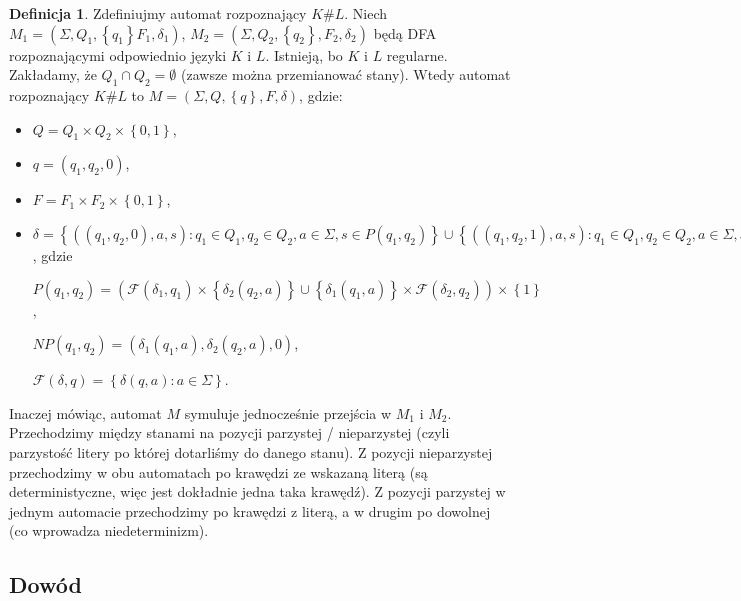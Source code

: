 \documentclass{article}
\theoremstyle{definition}
\newtheorem{definition}{Definicja}[section]
\theoremstyle{remark}
\newcommand{\singleton}[1]{\left\{ #1 \right\}}
\begin{document}
\begin{definition}

    Zdefiniujmy automat rozpoznający \(K \# L\). Niech \(M_1 = (\Sigma, Q_1,
    \singleton{q_1} F_1, \delta_1)\), \(M_2 = (\Sigma, Q_2, \singleton{q_2}, F_2,
    \delta_2)\) będą DFA rozpoznającymi odpowiednio języki \(K\) i \(L\). Istnieją,
    bo \(K\) i \(L\) regularne. Zakładamy, że \(Q_1 \cap Q_2 = \emptyset\) (zawsze
    można przemianować stany). Wtedy automat rozpoznający \(K \# L\) to \(M =
    (\Sigma, Q, \singleton{q}, F, \delta)\), gdzie:

    \begin{itemize}
        \item \(Q = Q_1 \times Q_2 \times \left\{ 0, 1 \right\}\),
        \item \(q = (q_1, q_2, 0)\),
        \item \(F = F_1 \times F_2 \times \left\{ 0, 1 \right\} \),
        \item \(\delta = \left\{ \left( \left(q_1, q_2, 0 \right), a, s \right): q_1 \in Q_1, q_2 \in Q_2, a \in \Sigma, s \in P(q_1, q_2) \right\}
              \cup \left\{ \left( \left(q_1, q_2, 1 \right), a, s\right): q_1 \in Q_1, q_2 \in Q_2, a \in \Sigma, s \in NP(q_1, q_2) \right\} \), gdzie

              \(P(q_1, q_2) = \left( \mathcal{F}(\delta_1, q_1) \times \singleton{\delta_2(q_2,a)}
              \cup \singleton{\delta_1(q_1,a)} \times \mathcal{F}(\delta_2, q_2) \right) \times \singleton{1}\),

              \(NP(q_1, q_2) =  \left( \delta_1(q_1,a), \delta_2(q_2,a), 0 \right)\),

              \(\mathcal{F}(\delta, q) = \left\{ \delta(q, a): a \in \Sigma \right\}\).
    \end{itemize}

    Inaczej mówiąc, automat \(M\) symuluje jednocześnie przejścia w \(M_1\) i
    \(M_2\). Przechodzimy między stanami na pozycji parzystej / nieparzystej (czyli
    parzystość litery po której dotarliśmy do danego stanu). Z pozycji nieparzystej
    przechodzimy w obu automatach po krawędzi ze wskazaną literą (są
    deterministyczne, więc jest dokładnie jedna taka krawędź). Z pozycji parzystej
    w jednym automacie przechodzimy po krawędzi z literą, a w drugim po dowolnej
    (co wprowadza niedeterminizm).
\end{definition}

\subsection{Dowód}
\end{document}
